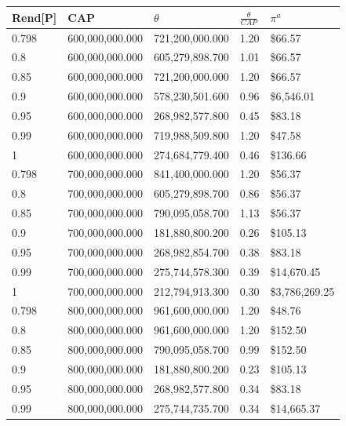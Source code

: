 \begin{table}[H]
    \centering
    \begin{tabular}{|l|l|l|l|l|}
    \hline
        Rend[P]  & CAP & $\theta$  & $\frac{\theta}{CAP}$  & $\pi^a$ \\ \hline
        0.798 & 600,000,000.000 & 721,200,000.000 & 1.20 &  \$66.57  \\ \hline
        0.8 & 600,000,000.000 & 605,279,898.700 & 1.01 &  \$66.57  \\ \hline
        0.85 & 600,000,000.000 & 721,200,000.000 & 1.20 &  \$66.57  \\ \hline
        0.9 & 600,000,000.000 & 578,230,501.600 & 0.96 &  \$6,546.01  \\ \hline
        0.95 & 600,000,000.000 & 268,982,577.800 & 0.45 &  \$83.18  \\ \hline
        0.99 & 600,000,000.000 & 719,988,509.800 & 1.20 &  \$47.58  \\ \hline
        1 & 600,000,000.000 & 274,684,779.400 & 0.46 &  \$136.66  \\ \hline
        0.798 & 700,000,000.000 & 841,400,000.000 & 1.20 &  \$56.37  \\ \hline
        0.8 & 700,000,000.000 & 605,279,898.700 & 0.86 &  \$56.37  \\ \hline
        0.85 & 700,000,000.000 & 790,095,058.700 & 1.13 &  \$56.37  \\ \hline
        0.9 & 700,000,000.000 & 181,880,800.200 & 0.26 &  \$105.13  \\ \hline
        0.95 & 700,000,000.000 & 268,982,854.700 & 0.38 &  \$83.18  \\ \hline
        0.99 & 700,000,000.000 & 275,744,578.300 & 0.39 &  \$14,670.45  \\ \hline
        1 & 700,000,000.000 & 212,794,913.300 & 0.30 &  \$3,786,269.25  \\ \hline
        0.798 & 800,000,000.000 & 961,600,000.000 & 1.20 &  \$48.76  \\ \hline
        0.8 & 800,000,000.000 & 961,600,000.000 & 1.20 &  \$152.50  \\ \hline
        0.85 & 800,000,000.000 & 790,095,058.700 & 0.99 &  \$152.50  \\ \hline
        0.9 & 800,000,000.000 & 181,880,800.200 & 0.23 &  \$105.13  \\ \hline
        0.95 & 800,000,000.000 & 268,982,577.800 & 0.34 &  \$83.18  \\ \hline
        0.99 & 800,000,000.000 & 275,744,735.700 & 0.34 &  \$14,665.37  \\ \hline

\end{tabular}
\end{table}
